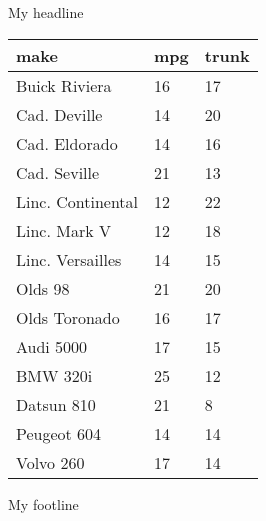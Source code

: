 \documentclass{article}
\begin{document}
\begin{center}
My headline
\end{center}
\begin{table}[h] \centering
{}

\begin{tabularx}{\linewidth}{lCC}

\toprule
{make}&{mpg}&{trunk} \tabularnewline
\midrule\addlinespace[1.5ex]
Buick Riviera&16&17 \tabularnewline
Cad. Deville&14&20 \tabularnewline
Cad. Eldorado&14&16 \tabularnewline
Cad. Seville&21&13 \tabularnewline
Linc. Continental&12&22 \tabularnewline
Linc. Mark V&12&18 \tabularnewline
Linc. Versailles&14&15 \tabularnewline
Olds 98&21&20 \tabularnewline
Olds Toronado&16&17 \tabularnewline
Audi 5000&17&15 \tabularnewline
BMW 320i&25&12 \tabularnewline
Datsun 810&21&8 \tabularnewline
Peugeot 604&14&14 \tabularnewline
Volvo 260&17&14 \tabularnewline
\bottomrule 

\end{tabularx}
\end{table}
My footline
\end{document}

